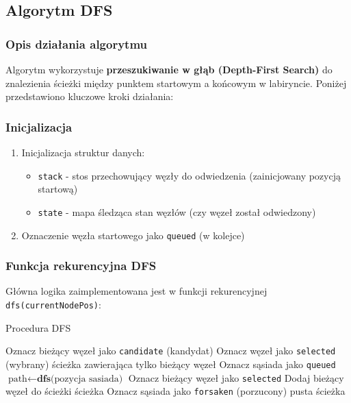 \documentclass[../../../../doc.tex]{subfiles}
\begin{document}
\subsection{Algorytm DFS}


\subsubsection{Opis działania algorytmu}

Algorytm wykorzystuje \textbf{przeszukiwanie w głąb (Depth-First Search)} do znalezienia ścieżki między punktem startowym a końcowym w labiryncie. Poniżej przedstawiono kluczowe kroki działania:

\subsubsection{Inicjalizacja}
\begin{enumerate}
  \item Inicjalizacja struktur danych:
        \begin{itemize}
          \item \texttt{stack} - stos przechowujący węzły do odwiedzenia (zainicjowany pozycją startową)
          \item \texttt{state} - mapa śledząca stan węzłów (czy węzeł został odwiedzony)
        \end{itemize}
  \item Oznaczenie węzła startowego jako \texttt{queued} (w kolejce)
\end{enumerate}

\subsubsection{Funkcja rekurencyjna DFS}
Główna logika zaimplementowana jest w funkcji rekurencyjnej \texttt{dfs(currentNodePos)}:

\begin{algorithm}
  \caption{Procedura DFS}
  \begin{algorithmic}
    \STATE Oznacz bieżący węzeł jako \texttt{candidate} (kandydat)
    \STATE Oznacz węzeł jako \texttt{selected} (wybrany)
    \RETURN ścieżka zawierająca tylko bieżący węzeł
    \ENDIF
    \STATE Oznacz sąsiada jako \texttt{queued}
    \STATE $\text{path} \leftarrow \textbf{dfs}\text{(pozycja sasiada)}$
    \STATE Oznacz bieżący węzeł jako \texttt{selected}
    \STATE Dodaj bieżący węzeł do ścieżki
    \RETURN ścieżka
    \ELSE
    \STATE Oznacz sąsiada jako \texttt{forsaken} (porzucony)
    \ENDIF
    \ENDIF
    \ENDFOR
    \RETURN pusta ścieżka
  \end{algorithmic}
\end{algorithm}
\end{document}
